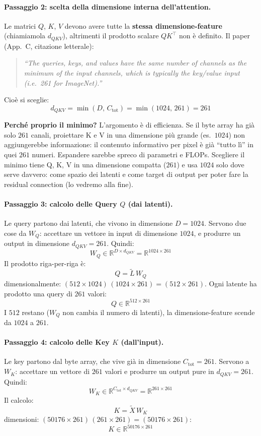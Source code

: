 \documentclass[
  11pt,
]{article}
\begin{document}
\paragraph{Passaggio 2: scelta della dimensione interna dell'attention.} Le matrici $Q$, $K$, $V$ devono avere tutte la \textbf{stessa dimensione-feature} (chiamiamola $d_{QKV}$), altrimenti il prodotto scalare $QK^\top$ non è definito. Il paper (App.\ C, citazione letterale):

\begin{quote}\small
\emph{``The queries, keys, and values have the same number of channels as the minimum of the input channels, which is typically the key/value input (i.e.\ 261 for ImageNet).''}
\end{quote}

Cioè si sceglie:
\[
d_{QKV} = \min(D,\, C_{\text{tot}}) = \min(1024,\, 261) = 261
\]

\textbf{Perché proprio il minimo?} L'argomento è di efficienza. Se il byte array ha già solo $261$ canali, proiettare K e V in una dimensione più grande (es.\ $1024$) non aggiungerebbe informazione: il contenuto informativo per pixel è già ``tutto lì'' in quei $261$ numeri. Espandere sarebbe spreco di parametri e FLOPs. Scegliere il minimo tiene Q, K, V in una dimensione compatta ($261$) e usa $1024$ solo dove serve davvero: come spazio dei latenti e come target di output per poter fare la residual connection (lo vedremo alla fine).

\paragraph{Passaggio 3: calcolo delle Query $Q$ (dai latenti).} Le query partono dai latenti, che vivono in dimensione $D = 1024$. Servono due cose da $W_Q$: accettare un vettore in input di dimensione $1024$, e produrre un output in dimensione $d_{QKV} = 261$. Quindi:
\[
W_Q \in \mathbb{R}^{D \times d_{QKV}} = \mathbb{R}^{1024 \times 261}
\]
Il prodotto riga-per-riga è:
\[
Q = \tilde{L}\, W_Q
\]
dimensionalmente: $(512 \times 1024)\,(1024 \times 261) = (512 \times 261)$. Ogni latente ha prodotto una query di $261$ valori:
\[
\boxed{Q \in \mathbb{R}^{512 \times 261}}
\]
I $512$ restano ($W_Q$ non cambia il numero di latenti), la dimensione-feature scende da $1024$ a $261$.

\paragraph{Passaggio 4: calcolo delle Key $K$ (dall'input).} Le key partono dal byte array, che vive già in dimensione $C_{\text{tot}} = 261$. Servono a $W_K$: accettare un vettore di $261$ valori e produrre un output pure in $d_{QKV} = 261$. Quindi:
\[
W_K \in \mathbb{R}^{C_{\text{tot}} \times d_{QKV}} = \mathbb{R}^{261 \times 261}
\]
Il calcolo:
\[
K = \tilde{X}\, W_K
\]
dimensioni: $(50176 \times 261)\,(261 \times 261) = (50176 \times 261)$:
\[
\boxed{K \in \mathbb{R}^{50176 \times 261}}
\]
\end{document}
